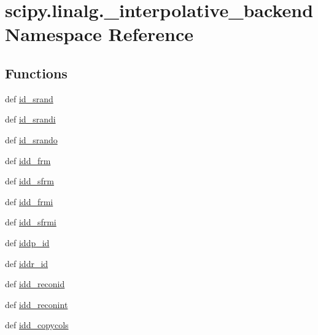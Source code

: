 \hypertarget{namespacescipy_1_1linalg_1_1__interpolative__backend}{}\section{scipy.\+linalg.\+\_\+interpolative\+\_\+backend Namespace Reference}
\label{namespacescipy_1_1linalg_1_1__interpolative__backend}
\subsection*{Functions}
\begin{DoxyCompactItemize}
\item 
def \hyperlink{namespacescipy_1_1linalg_1_1__interpolative__backend_abdf4970dd776dde170dd23634a8a3bc1}{id\+\_\+srand}
\item 
def \hyperlink{namespacescipy_1_1linalg_1_1__interpolative__backend_a48392c83034ae715a0a682d66e1dac73}{id\+\_\+srandi}
\item 
def \hyperlink{namespacescipy_1_1linalg_1_1__interpolative__backend_ac99d114e4189b5aa3c8f5414792268b8}{id\+\_\+srando}
\item 
def \hyperlink{namespacescipy_1_1linalg_1_1__interpolative__backend_ae08e4887437e875c6428867e7f4de414}{idd\+\_\+frm}
\item 
def \hyperlink{namespacescipy_1_1linalg_1_1__interpolative__backend_a7d0a382694d49adf39338c9e630651f0}{idd\+\_\+sfrm}
\item 
def \hyperlink{namespacescipy_1_1linalg_1_1__interpolative__backend_abca49ffbbae1baa2b1b850dd22ae47eb}{idd\+\_\+frmi}
\item 
def \hyperlink{namespacescipy_1_1linalg_1_1__interpolative__backend_a43d894046b8bbc02fb010721a5219eeb}{idd\+\_\+sfrmi}
\item 
def \hyperlink{namespacescipy_1_1linalg_1_1__interpolative__backend_a6955ec84fb3b1e6ff9a49df50c9c7d98}{iddp\+\_\+id}
\item 
def \hyperlink{namespacescipy_1_1linalg_1_1__interpolative__backend_a60dfbe8ca92a351adf393f357310f791}{iddr\+\_\+id}
\item 
def \hyperlink{namespacescipy_1_1linalg_1_1__interpolative__backend_a41f507e3e97bed7552bb6dea4a15506d}{idd\+\_\+reconid}
\item 
def \hyperlink{namespacescipy_1_1linalg_1_1__interpolative__backend_ae6c304ab5823c072e2db53e951755e2e}{idd\+\_\+reconint}
\item 
def \hyperlink{namespacescipy_1_1linalg_1_1__interpolative__backend_a61213c255e403a143fe331d7e9eed166}{idd\+\_\+copycols}

\end{DoxyCompactItemize}
